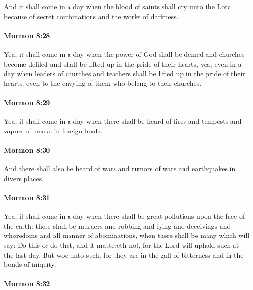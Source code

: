 			And it shall come in a day
			when the blood of saints shall cry unto the Lord
			because of secret combinations and the works of darkness.

		\paragraph{Mormon 8:28} %
			\label{MORMON-8-28}

			Yea, it shall come in a day
			when the power of God shall be denied
			and churches become defiled
			and shall be lifted up in the pride of their hearts,
			yea, even in a day when leaders of churches and teachers
			shall be lifted up in the pride of their hearts,
			even to the envying of them who belong to their churches.

		\paragraph{Mormon 8:29} %
			\label{MORMON-8-29}

			Yea, it shall come in a day
			when there shall be heard of fires and tempests
			and vapors of smoke in foreign lands.

		\paragraph{Mormon 8:30} %
			\label{MORMON-8-30}

			And there shall also be heard of wars and rumors of wars
			and earthquakes in divers places.

		\paragraph{Mormon 8:31} %
			\label{MORMON-8-31}

			Yea, it shall come in a day
			when there shall be great pollutions upon the face of the earth:
			there shall be murders and robbing and lying and deceivings and whoredoms
			and all manner of abominations,
			when there shall be many which will say:
			Do this or do that, and it mattereth not,
			for the Lord will uphold such at the last day.
			But woe unto such, for they are in the gall of bitterness
			and in the bonds of iniquity.

		\paragraph{Mormon 8:32} %
			\label{MORMON-8-32}

